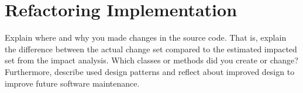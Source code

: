 \section{Refactoring Implementation}
Explain where and why you made changes in the source code.  That is, explain the difference between the actual change set compared to the estimated impacted set from the impact analysis. Which classes or methods did you create or change? Furthermore, describe used design patterns and reflect about improved design to improve future software maintenance.
